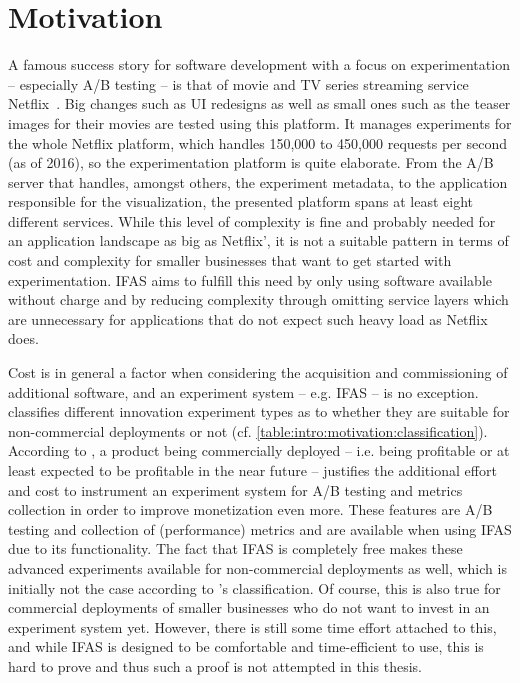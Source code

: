 
\section{Motivation}
\label{sec:intro:motivation}

A famous success story for software development with a focus on experimentation -- especially A/B testing -- is that of movie and TV series streaming service Netflix~\cite{WEB:Netflix:2016}.
Big changes such as UI redesigns as well as small ones such as the teaser images for their movies are tested using this platform.
It manages experiments for the whole Netflix platform, which handles 150,000 to 450,000 requests per second (as of 2016), so the experimentation platform is quite elaborate.
From the A/B server that handles, amongst others, the experiment metadata, to the application responsible for the visualization, the presented platform spans at least eight different services.
While this level of complexity is fine and probably needed for an application landscape as big as Netflix', it is not a suitable pattern in terms of cost and complexity for smaller businesses that want to get started with experimentation.
\ac{IFAS} aims to fulfill this need by only using software available without charge and by reducing complexity through omitting service layers which are unnecessary for applications that do not expect such heavy load as Netflix does.

Cost is in general a factor when considering the acquisition and commissioning of additional software, and an experiment system -- e.g. \ac{IFAS} -- is no exception.
\citet{Bosch2012} classifies different innovation experiment types as to whether they are suitable for non-commercial deployments or not (cf. \cref{table:intro:motivation:classification}).
According to \citeauthor{Bosch2012}, a product being commercially deployed -- i.e. being profitable or at least expected to be profitable in the near future -- justifies the additional effort and cost to instrument an experiment system for A/B testing and metrics collection in order to improve monetization even more.
These features are A/B testing and collection of (performance) metrics and are available when using \ac{IFAS} due to its functionality.
The fact that \ac{IFAS} is completely free makes these advanced experiments available for non-commercial deployments as well, which is initially not the case according to \citeauthor{Bosch2012}'s classification.
Of course, this is also true for commercial deployments of smaller businesses who do not want to invest in an experiment system yet.
However, there is still some time effort attached to this, and while \ac{IFAS} is designed to be comfortable and time-efficient to use, this is hard to prove and thus such a proof is not attempted in this thesis.

